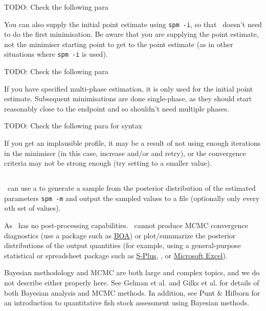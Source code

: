 TODO: Check the following para

You can also supply the initial point estimate using \texttt{spm -i}, so that \SPM\ doesn't need to do the first minimisation. Be aware that you are supplying the point estimate, not the minimiser starting point to get to the point estimate (as in other situations where \texttt{spm -i} is used).

TODO: Check the following para

If you have specified multi-phase estimation, it is only used for the initial point estimate. Subsequent minimisations are done single-phase, as they should start reasonably close to the endpoint and so shouldn't need multiple phases.

TODO: Check the following para for syntax

If you get an implausible profile, it may be a result of not using enough iterations in the minimiser (in this case, increase  and/or  and retry), or the convergence criteria may not be strong enough (try setting  to a smaller value).

\subsection{\label{sec:estimate-MCMC}}

\SPM\ can use a  to generate a sample from the posterior distribution of the estimated parameters \texttt{spm -m} and output the sampled values to a file (optionally only every $n$th set of values).

As \SPM\ has no post-processing capabilities. \SPM\ cannot produce MCMC convergence diagnostics (use a package such as \href{http://www.public-health.uiowa.edu/boa}{BOA}) or plot/summarize the posterior distributions of the output quantities (for example, using a general-purpose statistical or spreadsheet package such as \href{http://www.insightful.com}{S-Plus}, \href{http://www.r-project.org}{\R}, or \href{http://www.microsoft.com}{Microsoft Excel}).

Bayesian methodology and MCMC are both large and complex topics, and we do not describe either properly here. See Gelman et al. \citeyearpar{823} and Gilks et al. \citeyearpar{143} for details of both Bayesian analysis and MCMC methods. In addition, see Punt \& Hilborn \citeyearpar{828} for an introduction to quantitative fish stock assessment using Bayesian methods. 

